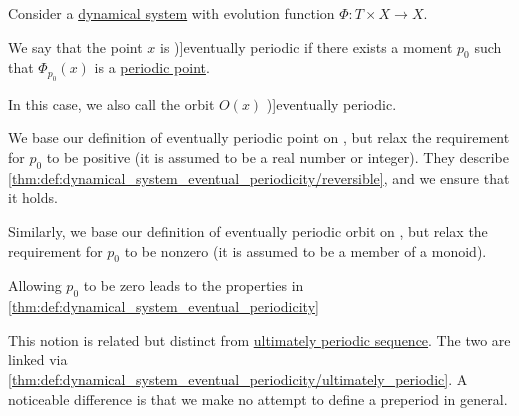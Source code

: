 \begin{definition}\label{def:dynamical_system_eventual_periodicity}
  Consider a \hyperref[def:dynamical_system]{dynamical system} with evolution function \( \Phi: T \times X \to X \).

  We say that the point \( x \) is \term[en=eventually periodic (point) (\cite[2]{BrinStuck2002DynamicalSystems})]{eventually periodic} if there exists a moment \( p_0 \) such that \( \Phi_{p_0}(x) \) is a \hyperref[def:dynamical_system_periodicity]{periodic point}.

  In this case, we also call the orbit \( O(x) \) \term[en=eventually periodic (orbit) (\cite[def. 12(ii)]{GiuntiMazzola2012DynamicalSystemsOnMonoids})]{eventually periodic}.
\end{definition}
\begin{comments}
  \item We base our definition of eventually periodic point on , but relax the requirement for \( p_0 \) to be positive (it is assumed to be a real number or integer). They describe \cref{thm:def:dynamical_system_eventual_periodicity/reversible}, and we ensure that it holds.

  Similarly, we base our definition of eventually periodic orbit on , but relax the requirement for \( p_0 \) to be nonzero (it is assumed to be a member of a monoid).

  Allowing \( p_0 \) to be zero leads to the properties in \cref{thm:def:dynamical_system_eventual_periodicity}

  \item This notion is related but distinct from \hyperref[def:ultimately_periodic_sequence]{ultimately periodic sequence}. The two are linked via \cref{thm:def:dynamical_system_eventual_periodicity/ultimately_periodic}. A noticeable difference is that we make no attempt to define a preperiod in general.
\end{comments}

